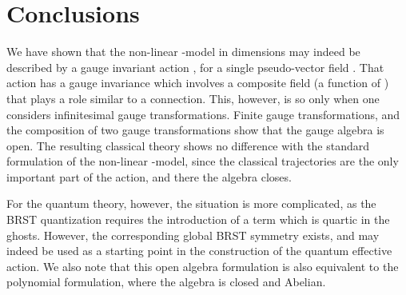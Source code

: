 \documentclass[a4paper,12pt]{article}
\begin{document}
\section{Conclusions}\label{sec:conc}
We have shown that the \coordHE{} non-linear \myHighlight{$\sigma$}\coordHE{}-model in \coordHE{}
dimensions may indeed be described by a gauge invariant action 
\coordHE{},  for a single pseudo-vector field \myHighlight{$\theta$}\coordHE{}. That
action has a gauge invariance which involves a composite field \coordHE{}
(a function of \myHighlight{$\theta$}\coordHE{}) that plays a role similar to a connection. 
This, however, is so only when one considers infinitesimal 
gauge transformations. Finite gauge transformations, and the
composition of two gauge transformations show that the gauge algebra
is open. The resulting classical theory shows no difference with the
standard formulation of the non-linear \myHighlight{$\sigma$}\coordHE{}-model, since the
classical trajectories are the only important part of the action, and
there the algebra closes. 

For the quantum theory, however, the situation is more complicated, as
the BRST quantization requires the introduction of a term which is
quartic in the ghosts. However, the corresponding global BRST symmetry
exists, and may indeed be used as a starting point in the construction
of the quantum effective action. We also note that this open algebra
formulation is also equivalent to the polynomial formulation, where
the algebra is closed and Abelian.
\end{document}
